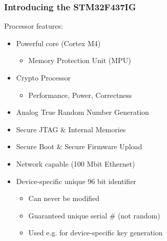 \subsubsection{Introducing the STM32F437IG}
Processor features:
\begin{itemize}
  \item Powerful core (Cortex M4)
  \begin{itemize}
    \item Memory Protection Unit (MPU)
  \end{itemize}
  \item Crypto Processor
  \begin{itemize}
    \item Performance, Power, Correctness
  \end{itemize}
  \item Analog True Random Number Generation
  \item Secure JTAG \& Internal Memories
  \item Secure Boot \& Secure Firmware Upload
  \item Network capable (100 Mbit Ethernet)
  \item Device-specific unique 96 bit identifier
  \begin{itemize}
    \item Can never be modified
    \item Guaranteed unique serial \# (not random)
    \item Used e.g. for device-specific key generation
  \end{itemize}
\end{itemize}

